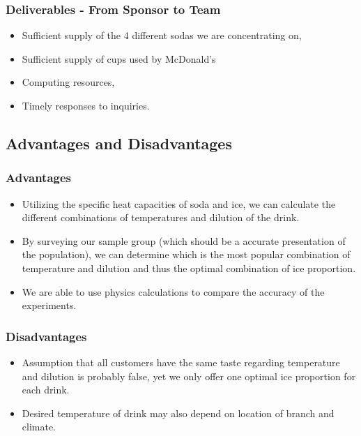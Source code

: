 \documentclass[compress,handout,10pt]{beamer}
\let\olditem\item
\renewcommand{\item}{\setlength{\itemsep}{0.5\baselineskip}\olditem}
\begin{document}
\begin{frame}
    \frametitle{Deliverables - From Sponsor to Team}

\begin{itemize}
    \item Sufficient supply of the 4 different sodas we are concentrating on,
\item Sufficient supply of cups used by McDonald's
    \item Computing resources,
    \item Timely responses to inquiries.
\end{itemize}
\end{frame}

\subsection{Advantages and Disadvantages}

\begin{frame}
    \frametitle{Advantages}

\begin {itemize}
\item Utilizing the specific heat capacities of soda and ice, we can calculate the different combinations of temperatures and dilution of the drink.
\item By surveying our sample group (which should be a accurate presentation of the population), we can determine which is the most popular combination of temperature and dilution and thus the optimal combination of ice proportion.
\item We are able to use physics calculations to compare the accuracy of the experiments.
\end{itemize}

\end{frame}

\begin{frame}
    \frametitle{Disadvantages}

\begin{itemize}
\item Assumption that all customers have the same taste regarding temperature and dilution is probably false, yet we only offer one optimal ice proportion for each drink.
\item Desired temperature of drink may also depend on location of branch and climate.

\end{itemize}

\end{frame}
 
\end{document}
